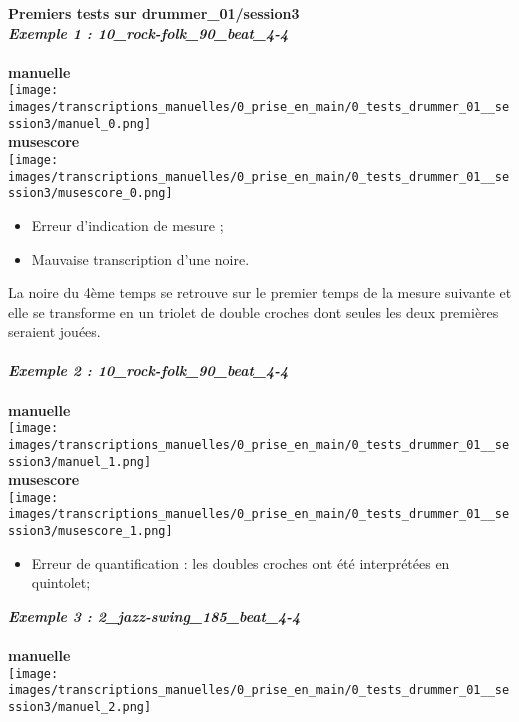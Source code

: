 \documentclass{report}
\begin{document}
	\textbf{Premiers tests sur drummer\_01/session3}\\
	
	\textbf{\textit{Exemple 1 : 10\_rock-folk\_90\_beat\_4-4}}\\\\
	\textbf{manuelle}\\
	\texttt{[image: images/transcriptions\_manuelles/0\_prise\_en\_main/0\_tests\_drummer\_01\_\_session3/manuel\_0.png]} \\
	\textbf{musescore}\\
	\texttt{[image: images/transcriptions\_manuelles/0\_prise\_en\_main/0\_tests\_drummer\_01\_\_session3/musescore\_0.png]} \\
	\begin{itemize}
		\item Erreur d’indication de mesure ;
		\item Mauvaise transcription d’une noire.\\
	\end{itemize}
	La noire du 4ème temps se retrouve sur le premier temps de la mesure suivante et elle se transforme en un triolet de double croches dont seules les deux premières seraient jouées.\\\\
	\textbf{\textit{Exemple 2 : 10\_rock-folk\_90\_beat\_4-4}}\\\\
	\textbf{manuelle}\\
	\texttt{[image: images/transcriptions\_manuelles/0\_prise\_en\_main/0\_tests\_drummer\_01\_\_session3/manuel\_1.png]} \\
	\textbf{musescore}\\
	\texttt{[image: images/transcriptions\_manuelles/0\_prise\_en\_main/0\_tests\_drummer\_01\_\_session3/musescore\_1.png]} \\
	\begin{itemize}
		\item Erreur de quantification : les doubles croches ont été interprétées en quintolet;\\
	\end{itemize}
	\textbf{\textit{Exemple 3 : 2\_jazz-swing\_185\_beat\_4-4}}
	\\\\
	\textbf{manuelle}\\
	\texttt{[image: images/transcriptions\_manuelles/0\_prise\_en\_main/0\_tests\_drummer\_01\_\_session3/manuel\_2.png]} \\
\end{document}
